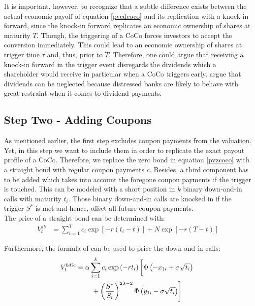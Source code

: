 %

It is important, however, to recognize that a subtle difference exists between the actual economic payoff of equation \ref{pvedcoco} and its replication with a knock-in forward, since the knock-in forward replicates an economic ownership of shares at maturity $T$. Though, the triggering of a CoCo forces investors to accept the conversion immediately. This could lead to an economic ownership of shares at trigger time $\tau$ and, thus, prior to $T$. Therefore, one could argue that receiving a knock-in forward in the trigger event disregards the dividends which a shareholder would receive in particular when a CoCo triggers early. \citet{de2011pricing} argue that dividends can be neglected because distressed banks are likely to behave with great restraint when it comes to dividend payments.

\subsection{Step Two - Adding Coupons}
As mentioned earlier, the first step excludes coupon payments from the valuation. Yet, in this step we want to include them in order to replicate the exact payout profile of a CoCo. Therefore, we replace the zero bond in equation \ref{pvzcoco} with a straight bond with regular coupon payments $c$. Besides, a third component has to be added which takes into account the foregone coupon payments if the trigger is touched. This can be modeled with a short position in $k$ binary down-and-in calls with maturity $t_i$. Those binary down-and-in calls are knocked in if the trigger $S^*$ is met and hence, offset all future coupon payments.\\ 

The price of a straight bond can be determined with:
\begin{align}
V^{sb}_t &= \sum^T_{i=1} c_i \exp\left[-r (t_i - t)\right] + N \exp\left[-r (T-t) \right]
\end{align}

Furthermore, the formula of \citet{rubinstein1991unscrambling} can be used to price the down-and-in calls:
\begin{align}
    V_t^{bdic} &= \alpha \sum^k_{i=1} c_i \exp\left(-r t_i\right) \left[ \Phi\left(-x_{1i} + \sigma \sqrt{t_i}\right)\vphantom{\dfrac{S^*}{S}}\right.\nonumber\\
   &\qquad \left.\vphantom{\dfrac{S^*}{S_t}} +\left(\dfrac{S^*}{S_t}\right)^{2\lambda -2} \Phi\left(y_{1i} - \sigma \sqrt{t_i}\right) \right]
\end{align}

